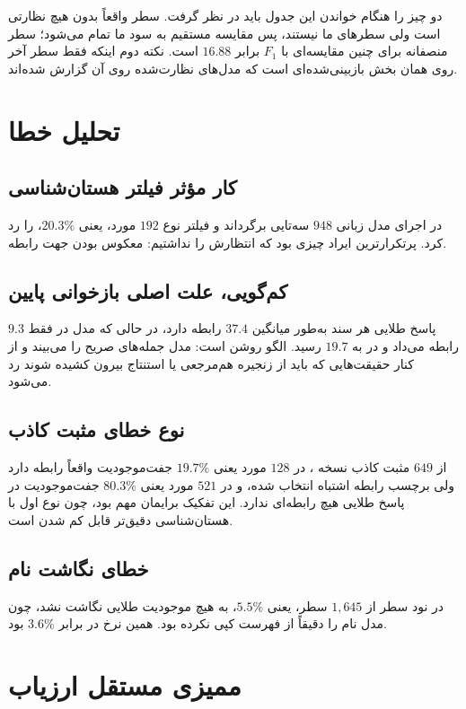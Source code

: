 دو چیز را هنگام خواندن این جدول باید در نظر گرفت. سطر  واقعاً بدون هیچ نظارتی است ولی سطرهای ما نیستند، پس مقایسه مستقیم به سود ما تمام می‌شود؛ سطر منصفانه برای چنین مقایسه‌ای  با $F_1$ برابر $16.88$ است. نکته دوم اینکه فقط سطر آخر روی همان بخش  بازبینی‌شده‌ای است که مدل‌های نظارت‌شده روی آن گزارش شده‌اند.

\section{تحلیل خطا}
\label{sec:error-analysis}

\subsection{کار مؤثر فیلتر هستان‌شناسی}
در اجرای  مدل زبانی $948$ سه‌تایی برگرداند و فیلتر نوع $192$ مورد، یعنی $20.3\%$، را رد کرد. پرتکرارترین ایراد چیزی بود که انتظارش را نداشتیم: معکوس بودن جهت رابطه.

\subsection{کم‌گویی، علت اصلی بازخوانی پایین}
پاسخ طلایی هر سند به‌طور میانگین $37.4$ رابطه دارد، در حالی که مدل در  فقط $9.3$ رابطه می‌داد و در  به $19.7$ رسید. الگو روشن است: مدل جمله‌های صریح را می‌بیند و از کنار حقیقت‌هایی که باید از زنجیره هم‌مرجعی یا استنتاج بیرون کشیده شوند رد می‌شود.

\subsection{نوع خطای مثبت کاذب}
از $649$ مثبت کاذب نسخه ، در $128$ مورد یعنی $19.7\%$ جفت‌موجودیت واقعاً رابطه دارد ولی برچسب رابطه اشتباه انتخاب شده، و در $521$ مورد یعنی $80.3\%$ جفت‌موجودیت در پاسخ طلایی هیچ رابطه‌ای ندارد. این تفکیک برایمان مهم بود، چون نوع اول با هستان‌شناسی دقیق‌تر قابل کم شدن است.

\subsection{خطای نگاشت نام}
در  نود سطر از $1{,}645$ سطر، یعنی $5.5\%$، به هیچ موجودیت طلایی نگاشت نشد، چون مدل نام را دقیقاً از فهرست کپی نکرده بود. همین نرخ در  برابر $3.6\%$ بود.

\section{ممیزی مستقل ارزیاب}
\label{sec:audit}

